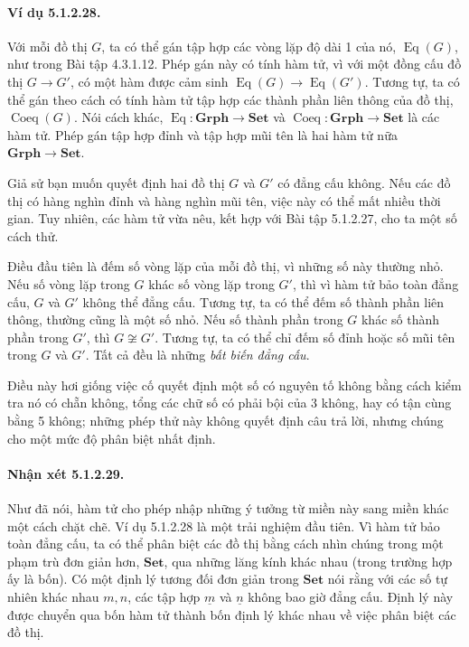 \paragraph{Ví dụ 5.1.2.28.} Với mỗi đồ thị $G$, ta có thể gán tập hợp các vòng lặp độ dài 1 của nó, $\operatorname{Eq}(G)$, như trong Bài tập 4.3.1.12. Phép gán này có tính hàm tử, vì với một đồng cấu đồ thị $G\to G'$, có một hàm được cảm sinh $\operatorname{Eq}(G)\to\operatorname{Eq}(G')$. Tương tự, ta có thể gán theo cách có tính hàm tử tập hợp các thành phần liên thông của đồ thị, $\operatorname{Coeq}(G)$. Nói cách khác, $\operatorname{Eq}:\mathbf{Grph}\to\mathbf{Set}$ và $\operatorname{Coeq}:\mathbf{Grph}\to\mathbf{Set}$ là các hàm tử. Phép gán tập hợp đỉnh và tập hợp mũi tên là hai hàm tử nữa $\mathbf{Grph}\to\mathbf{Set}$.

Giả sử bạn muốn quyết định hai đồ thị $G$ và $G'$ có đẳng cấu không. Nếu các đồ thị có hàng nghìn đỉnh và hàng nghìn mũi tên, việc này có thể mất nhiều thời gian. Tuy nhiên, các hàm tử vừa nêu, kết hợp với Bài tập 5.1.2.27, cho ta một số cách thử.

Điều đầu tiên là đếm số vòng lặp của mỗi đồ thị, vì những số này thường nhỏ. Nếu số vòng lặp trong $G$ khác số vòng lặp trong $G'$, thì vì hàm tử bảo toàn đẳng cấu, $G$ và $G'$ không thể đẳng cấu. Tương tự, ta có thể đếm số thành phần liên thông, thường cũng là một số nhỏ. Nếu số thành phần trong $G$ khác số thành phần trong $G'$, thì $G\not\cong G'$. Tương tự, ta có thể chỉ đếm số đỉnh hoặc số mũi tên trong $G$ và $G'$. Tất cả đều là những \emph{bất biến đẳng cấu}.

Điều này hơi giống việc cố quyết định một số có nguyên tố không bằng cách kiểm tra nó có chẵn không, tổng các chữ số có phải bội của 3 không, hay có tận cùng bằng 5 không; những phép thử này không quyết định câu trả lời, nhưng chúng cho một mức độ phân biệt nhất định.
\paragraph{Nhận xét 5.1.2.29.} Như đã nói, hàm tử cho phép nhập những ý tưởng từ miền này sang miền khác một cách chặt chẽ. Ví dụ 5.1.2.28 là một trải nghiệm đầu tiên. Vì hàm tử bảo toàn đẳng cấu, ta có thể phân biệt các đồ thị bằng cách nhìn chúng trong một phạm trù đơn giản hơn, $\mathbf{Set}$, qua những lăng kính khác nhau (trong trường hợp ấy là bốn). Có một định lý tương đối đơn giản trong $\mathbf{Set}$ nói rằng với các số tự nhiên khác nhau $m,n$, các tập hợp $\underline m$ và $\underline n$ không bao giờ đẳng cấu. Định lý này được chuyển qua bốn hàm tử thành bốn định lý khác nhau về việc phân biệt các đồ thị.
